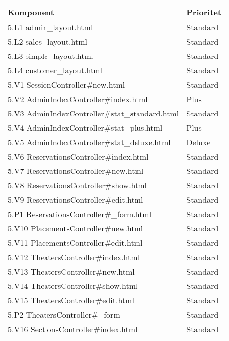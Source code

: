 \documentclass[a4paper, twoside, 11pt, titlepage]{article}
\begin{document}
		\begin {table} [ht] \begin{tabular} {  p{4cm} p{2cm} }
			\hline
			{ Komponent } & { Prioritet } \\
			\hline
			{ 5.L1 admin\_layout.html } & { Standard } \\
			\hline
			{ 5.L2 sales\_layout.html } & { Standard } \\
			\hline
			{ 5.L3 simple\_layout.html } & { Standard } \\
			\hline
			{ 5.L4 customer\_layout.html } & { Standard } \\
			\hline
			{ 5.V1 SessionController\#new.html } & { Standard } \\
			\hline
			{ 5.V2 AdminIndexController\#index.html } & { Plus } \\
			\hline
			{ 5.V3 AdminIndexController\#stat\_standard.html } & { Standard } \\
			\hline
			{ 5.V4 AdminIndexController\#stat\_plus.html } & { Plus } \\
			\hline
			{ 5.V5 AdminIndexController\#stat\_deluxe.html } & { Deluxe } \\
			\hline
			{ 5.V6 ReservationsController\#index.html } & { Standard } \\
			\hline
			{ 5.V7 ReservationsController\#new.html } & { Standard } \\
			\hline
			{ 5.V8 ReservationsController\#show.html } & { Standard } \\
			\hline
			{ 5.V9 ReservationsController\#edit.html } & { Standard } \\
			\hline
			{ 5.P1 ReservationsController\#\_form.html } & { Standard } \\
			\hline
			{ 5.V10 PlacementsController\#new.html } & { Standard } \\
			\hline
			{ 5.V11 PlacementsController\#edit.html } & { Standard } \\
			\hline
			{ 5.V12 TheatersController\#index.html } & { Standard } \\
			\hline
			{ 5.V13 TheatersController\#new.html } & { Standard } \\
			\hline
			{ 5.V14 TheatersController\#show.html } & { Standard } \\
			\hline
			{ 5.V15 TheatersController\#edit.html } & { Standard } \\
			\hline
			{ 5.P2 TheatersController\#\_form } & { Standard } \\
			\hline
			{ 5.V16 SectionsController\#index.html } & { Standard } \\

\end{tabular}
\end{table}
\end{document}
